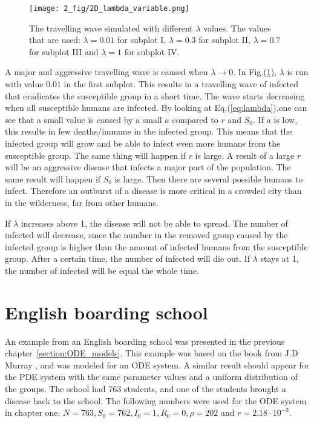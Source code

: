 \documentclass[%
twoside,                 %
final,                   %
chapterprefix=true,      %
open=right               %
10pt]{book}
\begin{document}
\begin{figure}[ht]
  \centerline{\texttt{[image: 2\_fig/2D\_lambda\_variable.png]}}
  \caption{
  \label{fig:change_lambda} The travelling wave simulated with different $\lambda$ values. The values that are used: $\lambda=0.01$ for subplot I, $\lambda=0.3$ for subplot II, $\lambda=0.7$ for subplot III and $\lambda=1$ for subplot IV.
  }
\end{figure}


A major and aggressive travelling wave is caused when $\lambda \rightarrow 0$. In Fig.(\ref{fig:change_lambda}), $\lambda$ is run with value 0.01 in the first subplot. This results in a travelling wave of infected that eradicates the susceptible group in a short time. The wave starts decreasing when all susceptible humans are infected. By looking at Eq.(\ref{eq:lambda}),one can see that a small value is caused by a small $a$ compared to $r$ and $S_0$. If $a$ is low, this results in few deaths/immune in the infected group. This means that the infected group will grow and be able to infect even more humans from the susceptible group. The same thing will happen if $r$ is large. A result of a large $r$ will be an aggressive disease that infects  a major part of the population. The same result will happen if $S_0$ is large. Then there are several possible humans to infect. Therefore an outburst of a disease is more critical in a crowded city than in the wilderness, far from other humans.


\vspace{3mm}




\vspace{3mm}


If $\lambda$ increases above 1, the disease will not be able to spread. The number of infected will decrease, since the number in the removed group caused by the infected group is higher than the amount of infected humans from the susceptible group. After a certain time, the number of infected will die out. If $\lambda$ stays at 1, the number of infected will be equal the whole time. 

\section{English boarding school}
\label{section:2_english}
An example from an English boarding school was presented in the previous chapter~\ref{section:ODE_models}. This example was based on the book from J.D Murray \cite{murray2002mathematical}, and was modeled for an ODE system. A similar result should appear for the PDE system with the same parameter values and a uniform distribution of the groups. The school had 763 students, and one of the students brought a disease back to the school. The following numbers were used for the ODE system in chapter one. $N=763, S_0=762,I_0=1,R_0=0,\rho=202$ and $r = 2.18\cdot 10^{-3}$. 
\end{document}
